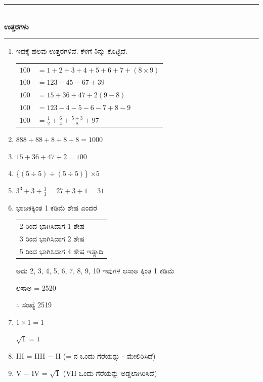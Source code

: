 \smallskip

\begin{center}
\rule{5cm}{1pt}\\[3pt]
{\Large\bfseries ಉತ್ತರಗಳು}\\[-0.1cm]
\rule{5cm}{1pt}
\end{center}

\begin{enumerate}
\item ಇದಕ್ಕೆ ಹಲವು ಉತ್ತರಗಳಿವೆ. ಕೆಳಗೆ 5ನ್ನು ಕೊಟ್ಟಿದೆ.

\begin{tabular}{ll}
$100$ & $= 1 + 2 + 3 + 4 + 5 + 6 + 7 + (8 \times 9)$\\
$100$ & $= 123 - 45 - 67 + 39$\\
$100$ & $= 15 + 36 + 47 + 2 (9 - 8)$\\
$100$ & $= 123 - 4 - 5 - 6 - 7 + 8 - 9$\\ 
$100$ & $= \frac{1}{2} + \frac{6}{4} + \frac{5 + 3}{8} + 97$
\end{tabular}

\smallskip
\item $888 + 88 + 8 + 8 + 8 = 1000$

\item $15 + 36 + 47 + 2 = 100$

\item \{$(5 \div 5) \div (5 \div 5)$\} $\times 5$

\item $3^{3} + 3 + \frac{3}{3} = 27 + 3 + 1 = 31$

\item ಭಾಜಕಕ್ಕಿಂತ 1 ಕಡಿಮೆ ಶೇಷ ಎಂದರೆ 

\begin{tabular}{l}
2 ರಿಂದ ಭಾಗಿಸಿದಾಗ 1 ಶೇಷ\\
3 ರಿಂದ ಭಾಗಿಸಿದಾಗ 2 ಶೇಷ\\
5 ರಿಂದ ಭಾಗಿಸಿದಾಗ 4 ಶೇಷ ಇತ್ಯಾದಿ
\end{tabular}

ಅದು 2, 3, 4, 5, 6, 7, 8, 9, 10 ಇವುಗಳ ಲಸಾಅ ಕ್ಕಿಂತ 1 ಕಡಿಮೆ 

ಲಸಾಅ = 2520

$\therefore$ ಸಂಖ್ಯೆ  2519

\item $1 \times 1 = 1$

$\sqrt{1} = 1$

\item III = IIII $-$ II (= ನ ಒಂದು ಗೆರೆಯನ್ನು - ಮೇಲಿರಿಸಿದೆ)

\item V $-$ IV = $\sqrt{1}$ (VII ಒಂದು ಗೆರೆಯನ್ನು ಅಡ್ಡಲಾಗಿರಿಸಿದೆ)


\end{enumerate}
